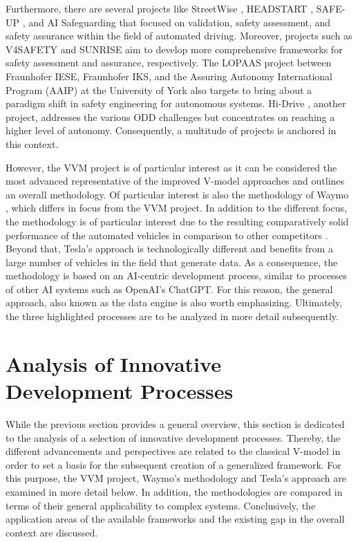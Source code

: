 Furthermore, there are several projects like StreetWise \cite{elrofai2018streetwise}, HEADSTART \cite{HEADSTART}, SAFE-UP \cite{SAFEUP}, and AI Safeguarding \cite{ki_absicherung} that focused on validation, safety assessment, and safety assurance within the field of automated driving. Moreover, projects such as V4SAFETY \cite{V4SAFETY} and SUNRISE \cite{SUNRISE} aim to develop more comprehensive frameworks for safety assessment and assurance, respectively. The LOPAAS \cite{LOPAAS} project between Fraunhofer IESE, Fraunhofer IKS, and the Assuring Autonomy International Program (AAIP) at the University of York also targets to bring about a paradigm shift in safety engineering for autonomous systems. Hi-Drive \cite{HIDrive}, another project, addresses the various ODD challenges but concentrates on reaching a higher level of autonomy. Consequently, a multitude of projects is anchored in this context. 

However, the VVM \cite{VVM} project is of particular interest as it can be considered the most advanced representative of the improved V-model approaches and outlines an overall methodology. Of particular interest is also the methodology of Waymo \cite{favaro2023building}, which differs in focus from the VVM \cite{VVM} project. In addition to the different focus, the methodology is of particular interest due to the resulting comparatively solid performance \cite{kusano2023comparison} of the automated vehicles in comparison to other competitors \cite{equipmentrecallreport, NHTSARecall23E, NHTSARecallLetter}. Beyond that, Tesla's approach \cite{karpathy_cvpr21} is technologically different and benefits from a large number of vehicles in the field that generate data. As a consequence, the methodology is based on an AI-centric development process, similar to processes of other AI systems such as OpenAI's ChatGPT. For this reason, the general approach, also known as the data engine is also worth emphasizing. Ultimately, the three highlighted processes are to be analyzed in more detail subsequently.

\section{Analysis of Innovative Development Processes}\label{02_New}
While the previous section provides a general overview, this section is dedicated to the analysis of a selection of innovative development processes. Thereby, the different advancements and perspectives are related to the classical V-model in order to set a basis for the subsequent creation of a generalized framework. For this purpose, the VVM \cite{VVM} project, Waymo's methodology \cite{favaro2023building} and Tesla's approach \cite{karpathy_cvpr21} are examined in more detail below. In addition, the methodologies are compared in terms of their general applicability to complex systems. Conclusively, the application areas of the available frameworks and the existing gap in the overall context are discussed.  

